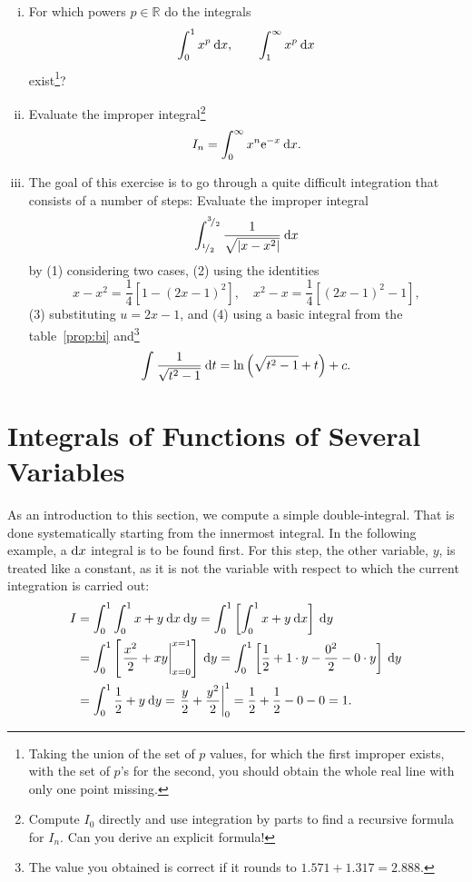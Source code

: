 \begin{exercise}
\begin{enumerate}[(i)]
	\item For which powers $p\in\mathbb{R}$ do the integrals
		\[ \int_{0}^{1} x^p \: \mathrm{d} x, \qquad \int_{1}^{\infty} x^p \: \mathrm{d} x \]
	exist\footnote{Taking the union of the set of $p$ values, for which the first improper exists, with the set of $p$'s for the second, you should obtain the whole real line with only one point missing.}?		
	\item Evaluate the improper integral\footnote{Compute $I_0$ directly and use integration by parts to find a recursive formula for $I_n$. Can you derive an explicit formula!}
		\[ I_n = \int_{0}^{\infty} x^n\mathrm{e}^{-x} \: \mathrm{d} x. \]
	\item The goal of this exercise is to go through a quite difficult integration that consists of a number of steps: Evaluate the improper integral
		\[ \int_{{}^{1}\!/_{2}}^{{}^{3}\!/_{2}} \frac{1}{\sqrt{\left| x-x^2 \right|}} \: \mathrm{d} x \]
	by (1) considering two cases, (2) using the identities
	\[ x-x^2 = \frac14\left[ 1-(2x-1)^2 \right], 
	\quad x^2-x = \frac14\left[ (2x-1)^2-1 \right], \]
	(3) substituting $u=2x-1$, and (4) using a basic integral from the table~\ref{prop:bi} and\footnote{The value you obtained is correct if it rounds to $1.571+1.317=2.888$.}
	\[ \int_{}^{} \frac{1}{\sqrt{t^2-1}} \: \mathrm{d} t =\ln \left( \sqrt{t^2-1}+t \right)+c.\]
\end{enumerate}		
\end{exercise}


\section{Integrals of Functions of Several Variables}

\begin{example}
\label{expl:first_higher-dim_int}
As an introduction to this section, we compute a simple double-integral. That is done systematically starting from the innermost integral. In the following example, a $\mathrm{d} x$ integral is to be found first. For this step, the other variable, $y$, is treated like a constant, as it is not the variable with respect to which the current integration is carried out:
\begin{equation*}
\begin{split}
I & = \int_{0}^{1} \int_{0}^{1} x+y \: \mathrm{d} x \: \mathrm{d} y 
= \int_{0}^{1} \left[\int_{0}^{1} x+y \: \mathrm{d} x\right] \: \mathrm{d} y \\
& = \int_{0}^{1} \left[ \left. \frac{x^2}{2} + xy \right|_{x=0}^{x=1} \right] \: \mathrm{d} y 
= \int_{0}^{1} \left[ \frac{1}{2} + 1 \cdot y - \frac{0^2}{2} - 0 \cdot y \right] \: \mathrm{d} y \\
& = \int_{0}^{1} \frac12+y \: \mathrm{d} y = \left. \frac{y}{2} + \frac{y^2}{2} \right|_0^1 
= \frac12 + \frac 12 - 0 - 0 = 1.
\end{split}
\end{equation*}
\end{example}

